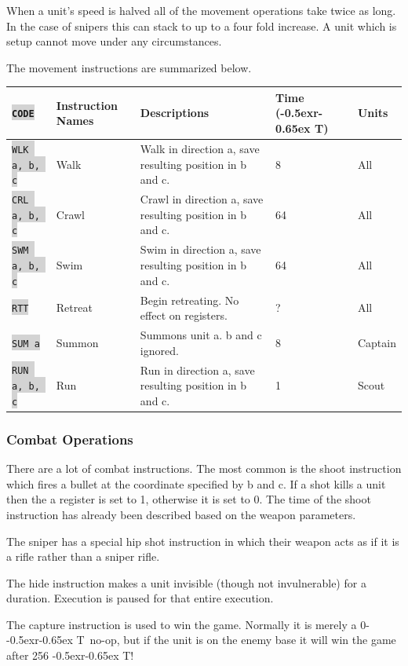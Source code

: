 \documentclass{article}
\newcommand{\vnscode}[1]{\colorbox{lightgray}{\lstinline[language=vns]{#1}}}
\newcommand{\RT}{\lower-0.5ex\hbox{r}\kern-0.65ex T}
\begin{document}
When a unit's speed is halved all of the movement operations take twice as long.
In the case of snipers this can stack to up to a four fold increase. A unit
which is setup cannot move under any circumstances.

The movement instructions are summarized below.

\begin{minipage}{\textwidth}
\label{table:movement}
\centering
\begin{tabular}{lllll}
    \hline \vnscode{CODE} & Instruction Names & Descriptions & Time (\RT) & Units \\ \hline
    \vnscode{WLK a, b, c} & Walk & Walk in direction a, save resulting position in b and c. & 8 & All \\
    \vnscode{CRL a, b, c} & Crawl & Crawl in direction a, save resulting position in b and c. & 64 & All \\
    \vnscode{SWM a, b, c} & Swim & Swim in direction a, save resulting position in b and c. & 64 & All \\
    \vnscode{RTT} & Retreat & Begin retreating. No effect on registers. & ? & All \\
    \vnscode{SUM a} & Summon & Summons unit a. b and c ignored. & 8 & Captain \\
    \vnscode{RUN a, b, c} & Run & Run in direction a, save resulting position in b and c. & 1 & Scout \\
\end{tabular}
\end{minipage}

\subsubsection{Combat Operations}

There are a lot of combat instructions. The most common is the shoot instruction
which fires a bullet at the coordinate specified by b and c. If a shot kills a
unit then the a register is set to 1, otherwise it is set to 0. The time of the
shoot instruction has already been described based on the weapon parameters.

The sniper has a special hip shot instruction in which their weapon acts as if
it is a rifle rather than a sniper rifle.

The hide instruction makes a unit invisible (though not invulnerable) for a
duration. Execution is paused for that entire execution.

The capture instruction is used to win the game. Normally it is merely a 0-\RT\
no-op, but if the unit is on the enemy base it will win the game after 256 \RT!
\end{document}

